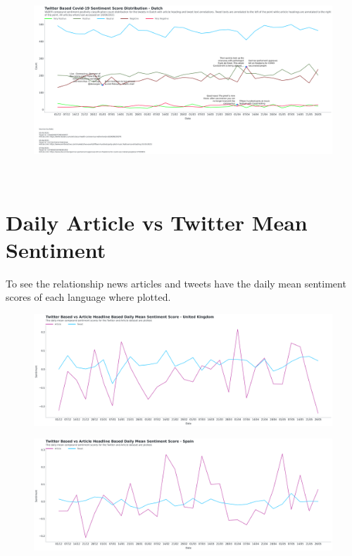 \begin{landscape}
\begin{figure}[h!]
\includegraphics[scale=0.33]{Final Dutch Annotated Distribution.png}
\caption[Final Dutch Annotated Distribution]{ }
\label{fig:Dutch}
\end{figure}


\newpage~\newpage~\newpage~\newpage~\newpage~\newpage

\section{Daily Article vs Twitter Mean Sentiment}

To see the relationship news articles and tweets have the daily mean sentiment scores of each language where plotted.

\begin{figure}[h!]
\includegraphics[scale=0.33]{Daily Mean Article VS Twitter UK.png}
\caption[Daily Mean Article VS Twitter]{ }
\label{fig:artcilevstwitteruk}
\end{figure}

\begin{figure}[h!]
\includegraphics[scale=0.33]{Daily Mean Article VS Twitter Spain.png}
\caption[Daily Mean Article VS Twitter]{ }
\label{fig:artcilevstwitteres}
\end{figure}


\end{landscape}

